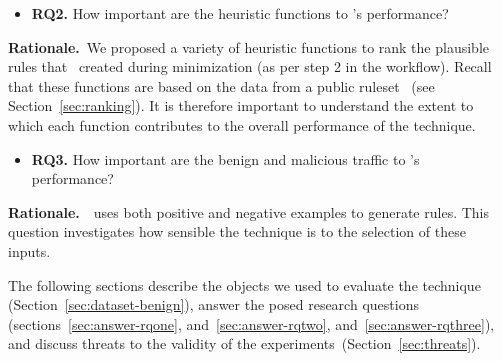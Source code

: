 \documentclass[sigconf,review, anonymous]{acmart}
\begin{document}
\newcommand{\textRQtwo}{How important are the heuristic functions
  to \tname's performance?}
\vspace{0.2cm}
\begin{itemize}[leftmargin=*,label={}]
\item{\textbf{RQ2.}} \textRQtwo\
\end{itemize}

\noindent
\textbf{Rationale.}~We proposed a variety of heuristic functions to
rank the plausible rules that \tname\ created during minimization (as
per step 2 in the workflow). Recall that these functions are based on
the data from a public ruleset~\cite{emerging-threats-open} (see
Section~\ref{sec:ranking}). It is therefore important to understand
the extent to which each function contributes to the overall
performance of the technique.

\newcommand{\textRQthree}{How important are the benign and
  malicious traffic to \tname's performance?}
\vspace{0.2cm}
\begin{itemize}[leftmargin=*,label={}]
\item{\textbf{RQ3.}} \textRQthree\
\end{itemize}

\noindent
\textbf{Rationale.}~\tname\ uses both positive and negative examples
to generate rules. This question investigates how sensible the
technique is to the selection of these inputs.
\noindent
\vspace{1ex}

The following sections describe the objects we used to evaluate the
technique (Section~\ref{sec:dataset-benign}), answer the posed
research questions (sections~\ref{sec:answer-rqone},
and~\ref{sec:answer-rqtwo}, and~\ref{sec:answer-rqthree}), and
discuss threats to the validity of the
experiments~(Section~\ref{sec:threats}).
\end{document}
